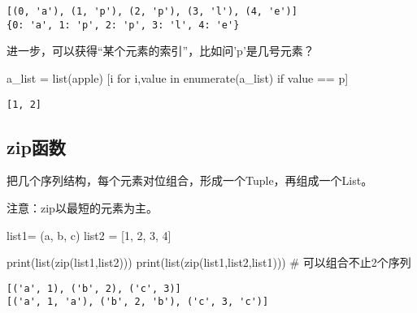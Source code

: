 \documentclass[
  letterpaper,
  DIV=11,
  numbers=noendperiod]{scrreprt}
\newenvironment{Shaded}{\begin{snugshade}}{\end{snugshade}}
\newcommand{\BuiltInTok}[1]{\textcolor[rgb]{0.00,0.23,0.31}{#1}}
\newcommand{\CommentTok}[1]{\textcolor[rgb]{0.37,0.37,0.37}{#1}}
\newcommand{\ControlFlowTok}[1]{\textcolor[rgb]{0.00,0.23,0.31}{#1}}
\newcommand{\DecValTok}[1]{\textcolor[rgb]{0.68,0.00,0.00}{#1}}
\newcommand{\KeywordTok}[1]{\textcolor[rgb]{0.00,0.23,0.31}{#1}}
\newcommand{\NormalTok}[1]{\textcolor[rgb]{0.00,0.23,0.31}{#1}}
\newcommand{\OperatorTok}[1]{\textcolor[rgb]{0.37,0.37,0.37}{#1}}
\newcommand{\StringTok}[1]{\textcolor[rgb]{0.13,0.47,0.30}{#1}}
\begin{document}
\begin{verbatim}
[(0, 'a'), (1, 'p'), (2, 'p'), (3, 'l'), (4, 'e')]
{0: 'a', 1: 'p', 2: 'p', 3: 'l', 4: 'e'}
\end{verbatim}

进一步，可以获得``某个元素的索引''，比如问'p'是几号元素？

\begin{Shaded}
\begin{Highlighting}[]
\NormalTok{a\_list }\OperatorTok{=} \BuiltInTok{list}\NormalTok{(}\StringTok{\textquotesingle{}apple\textquotesingle{}}\NormalTok{)}
\NormalTok{[i }\ControlFlowTok{for}\NormalTok{ i,value }\KeywordTok{in} \BuiltInTok{enumerate}\NormalTok{(a\_list) }\ControlFlowTok{if}\NormalTok{ value }\OperatorTok{==} \StringTok{\textquotesingle{}p\textquotesingle{}}\NormalTok{]}
\end{Highlighting}
\end{Shaded}

\begin{verbatim}
[1, 2]
\end{verbatim}

\hypertarget{zipux51fdux6570}{%
\subsection{zip函数}\label{zipux51fdux6570}}

把几个序列结构，每个元素对位组合，形成一个Tuple，再组成一个List。

注意：zip以最短的元素为主。

\begin{Shaded}
\begin{Highlighting}[]
\NormalTok{list1}\OperatorTok{=}\NormalTok{ (}\StringTok{\textquotesingle{}a\textquotesingle{}}\NormalTok{, }\StringTok{\textquotesingle{}b\textquotesingle{}}\NormalTok{, }\StringTok{\textquotesingle{}c\textquotesingle{}}\NormalTok{)}
\NormalTok{list2 }\OperatorTok{=}\NormalTok{ [}\DecValTok{1}\NormalTok{, }\DecValTok{2}\NormalTok{, }\DecValTok{3}\NormalTok{, }\DecValTok{4}\NormalTok{]}

\BuiltInTok{print}\NormalTok{(}\BuiltInTok{list}\NormalTok{(}\BuiltInTok{zip}\NormalTok{(list1,list2)))}
\BuiltInTok{print}\NormalTok{(}\BuiltInTok{list}\NormalTok{(}\BuiltInTok{zip}\NormalTok{(list1,list2,list1))) }\CommentTok{\# 可以组合不止2个序列}
\end{Highlighting}
\end{Shaded}

\begin{verbatim}
[('a', 1), ('b', 2), ('c', 3)]
[('a', 1, 'a'), ('b', 2, 'b'), ('c', 3, 'c')]
\end{verbatim}
\end{document}
